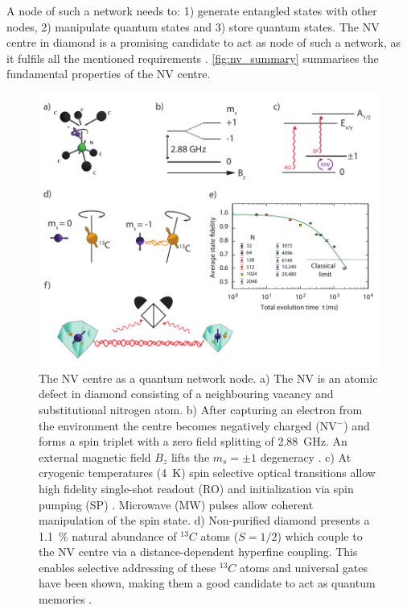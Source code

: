 \documentclass[a4paper]{article}
\begin{document}
A node of such a network needs to: 1) generate entangled states with other nodes, 2) manipulate quantum states and 3) store quantum states. The \ac{NV} centre in diamond is a promising candidate to act as node of such a network, as it fulfils all the mentioned requirements \cite{Awschalom2018}. \autoref{fig:nv_summary} summarises the fundamental properties of the \ac{NV} centre.

\begin{figure}
	\centering
	\includegraphics[width=\textwidth]{images/figure1}
	\caption{The \ac{NV} centre as a quantum network node. 
		a) The \ac{NV} is an atomic defect in diamond consisting of a neighbouring vacancy and substitutional nitrogen atom.
		b) After capturing an electron from the environment the centre becomes negatively charged (\ac{NV}${}^-$) and forms a spin triplet with a zero field splitting of \SI{2.88}{GHz}. An external magnetic field $B_z$ lifts the $m_s = \pm 1$ degeneracy \cite{Doherty2013}.
		c) At cryogenic temperatures (\SI{4}{K}) spin selective optical transitions allow high fidelity single-shot readout (\textsc{RO}) and initialization via spin pumping (\textsc{SP}) \cite{Robledo2011}. Microwave (\acs{MW}) pulses allow coherent manipulation of the spin state.
		d) Non-purified diamond presents a \SI{1.1}{\percent} natural abundance of ${}^{13} C$ atoms ($S = 1/2$) which couple to the \ac{NV} centre via a distance-dependent hyperfine coupling. This enables selective addressing of these  ${}^{13} C$ atoms and universal gates have been shown, making them a good candidate to act as quantum memories \cite{Taminiau2014}.
}
\end{figure}
\end{document}
